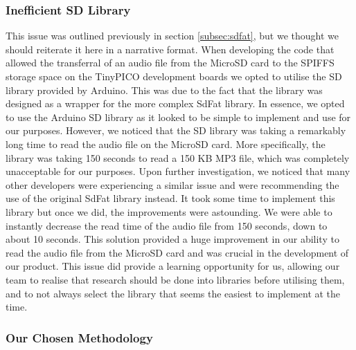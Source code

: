                 

            \subsubsection{Inefficient SD Library}
            \label{subsubsec:sd}

                This issue was outlined previously in section \ref{subsec:sdfat}, but we thought we should reiterate it here in a narrative format. When developing the code that allowed the transferral of an audio file from the MicroSD card to the SPIFFS storage space on the TinyPICO development boards we opted to utilise the SD library provided by Arduino. This was due to the fact that the library was designed as a wrapper for the more complex SdFat library. In essence, we opted to use the Arduino SD library as it looked to be simple to implement and use for our purposes. However, we noticed that the SD library was taking a remarkably long time to read the audio file on the MicroSD card. More specifically, the library was taking 150 seconds to read a 150 KB MP3 file, which was completely unacceptable for our purposes. Upon further investigation, we noticed that many other developers were experiencing a similar issue and were recommending the use of the original SdFat library instead. It took some time to implement this library but once we did, the improvements were astounding. We were able to instantly decrease the read time of the audio file from 150 seconds, down to about 10 seconds. This solution provided a huge improvement in our ability to read the audio file from the MicroSD card and was crucial in the development of our product. This issue did provide a learning opportunity for us, allowing our team to realise that research should be done into libraries before utilising them, and to not always select the library that seems the easiest to implement at the time.

            \subsubsection{Our Chosen Methodology}

